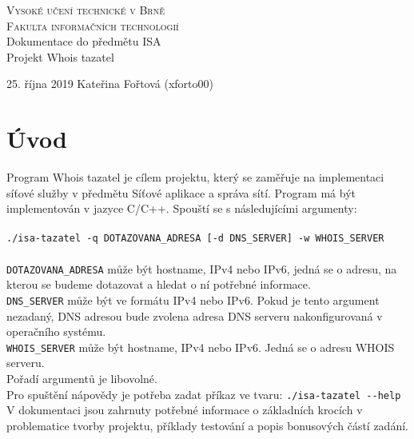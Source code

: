 \documentclass[a4paper, 11pt]{article}
\begin{document}
\begin{titlepage}
\begin{center}
\textsc{\Huge Vysoké učení technické v Brně\\ \medskip
\huge Fakulta informačních technologií}\\
\LARGE Dokumentace do předmětu ISA\\
\Huge  Projekt Whois tazatel\\
\begin{Large}
25. října 2019\hfill
Kateřina Fořtová (xforto00)
\end{Large}
\end{center}



\end{titlepage}

\tableofcontents
\newpage



\section{Úvod}
Program Whois tazatel je cílem projektu, který se zaměřuje na implementaci síťové služby v předmětu Síťové aplikace a správa sítí. Program má být implementován v jazyce C/C++. Spouští se s následujícími argumenty:\\\\
 \verb|./isa-tazatel -q DOTAZOVANA_ADRESA [-d DNS_SERVER] -w WHOIS_SERVER|\\\\
 \verb|DOTAZOVANA_ADRESA| může být hostname, IPv4 nebo IPv6, jedná se o adresu, na kterou se budeme dotazovat a hledat o ní potřebné informace.\\
 \verb|DNS_SERVER| může být ve formátu IPv4 nebo IPv6. Pokud je tento argument nezadaný, DNS adresou bude zvolena adresa DNS serveru nakonfigurovaná v operačního systému.\\
 \verb|WHOIS_SERVER| může být hostname, IPv4 nebo IPv6. Jedná se o adresu WHOIS serveru.\\
 Pořadí argumentů je libovolné.\\
 Pro spuštění nápovědy je potřeba zadat příkaz ve tvaru: \verb|./isa-tazatel --help|\\
 V dokumentaci jsou zahrnuty potřebné informace o základních krocích v problematice tvorby projektu, příklady testování a popis bonusových částí zadání.
\end{document}
